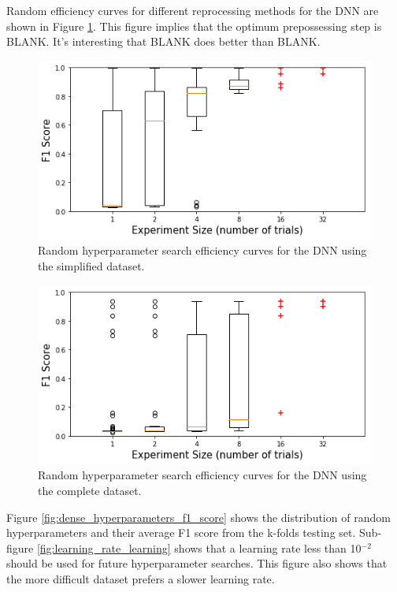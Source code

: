 Random efficiency curves for different reprocessing methods for the DNN are shown in Figure \ref{fig:random_hp_search_dnn_easy}. This figure implies that the optimum prepossessing step is BLANK. It's interesting that BLANK does better than BLANK.

\begin{figure}[H]
	\centering
	\includegraphics[width=0.8\linewidth]{images/random_hp_search_dnn_easy}
	\caption{Random hyperparameter search efficiency curves for the DNN using the simplified dataset.}
	\label{fig:random_hp_search_dnn_easy}
\end{figure}

\begin{figure}[H]
	\centering
	\includegraphics[width=0.8\linewidth]{images/random_hp_search_dnn_full}
	\caption{Random hyperparameter search efficiency curves for the DNN using the complete dataset.}
	\label{fig:random_hp_search_dnn_full}
\end{figure}


Figure \ref{fig:dense_hyperparameters_f1_score} shows the distribution of random hyperparameters and their average F1 score from the k-folds testing set. Sub-figure \ref{fig:learning_rate_learning} shows that a learning rate less than 10$^{-2}$ should be used for future hyperparameter searches. This figure also shows that the more difficult dataset prefers a slower learning rate. 


